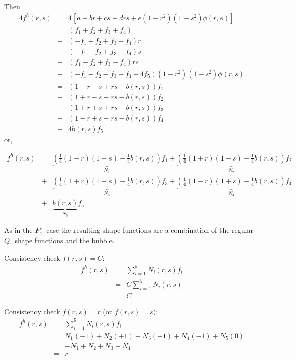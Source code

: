 Then 
\begin{eqnarray}
4f^h(r,s)
&=&4 [a+br+cs+drs+e (1-r^2) (1-s^2) \phi(r,s)] \\
&=&  (f_1 + f_2 +f_3 +f_4) \\
&+& (-f_1 + f_2 +f_3 -f_4)r \\
&+&(-f_1 - f_2 +f_3 +f_4)s \\
&+& (f_1 - f_2 +f_3 -f_4)rs \\
&+& (-f_1 - f_2 -f_3 -f_4 + 4f_5) (1-r^2) (1-s^2) \phi(r,s) \\
&=& (1-r-s+rs - b(r,s))f_1 \\
&+& (1+r-s-rs-b(r,s))f_2 \\
&+& (1+r+s+rs-b(r,s))f_3 \\
&+& (1-r+s-rs- b(r,s))f_4 \\
&+& 4b(r,s) f_5
\end{eqnarray}
or, 

\begin{eqnarray}
f^h(r,s)&=&
\underbrace{\left(\frac{1}{4}(1-r)(1-s)-\frac{1}{4}b(r,s)\right)}_{N_1} f_1 + 
\underbrace{\left(\frac{1}{4}(1+r)(1-s)-\frac{1}{4}b(r,s)\right)}_{N_2} f_2\\
&+& 
\underbrace{\left(\frac{1}{4}(1+r)(1+s)-\frac{1}{4}b(r,s)\right)}_{N_3} f_3 +
\underbrace{\left(\frac{1}{4}(1-r)(1+s)-\frac{1}{4}b(r,s)\right)}_{N_4} f_4 \\
&+& \underbrace{b(r,s)}_{N_5} f_5
\end{eqnarray}

As in the $P_1^+$ case the resulting shape functions are a combination 
of the regular $Q_1$ shape functions and the bubble.


Consistency check $f(r,s)=C$:
\begin{eqnarray}
f^h(r,s) 
&=& \sum_{i=1}^5 N_i(r,s) f_i \\
&=& C \sum_{i=1}^5 N_i(r,s)  \\
&=& C
\end{eqnarray}

Consistency check $f(r,s)=r$ (or $f(r,s)=s)$:
\begin{eqnarray}
f^h(r,s) 
&=& \sum_{i=1}^5 N_i(r,s) f_i \\
&=& N_1 (-1) + N_2 (+1) + N_3 (+1) + N_4 (-1) + N_5 (0) \\
&=& -N_1+N_2+N_3-N_4 \\
&=& r
\end{eqnarray}

